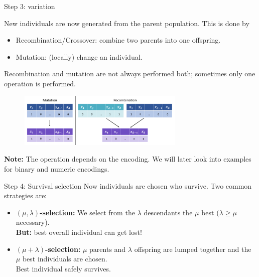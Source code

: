 \documentclass[11pt,compress,t,notes=noshow, xcolor=table]{beamer}
\begin{document}
\begin{vbframe}{Step 3: variation}

New individuals are now generated from the parent population. This is done by

\begin{itemize}
\item Recombination/Crossover: combine two parents into one offspring.
\item Mutation: (locally) change an individual.
\end{itemize}

Recombination and mutation are not always performed both; sometimes only one operation is performed.

\vspace{0.3cm}
\begin{center}
\begin{figure}
  \includegraphics[width = 8cm, height = 2.6cm ]{figure_man/rec-and-mut.png}\\
\end{figure}
\end{center}

\textbf{Note: } The operation depends on the encoding. We will later look into examples for binary and numeric encodings. 

\end{vbframe}




  
\begin{vbframe}{Step 4: Survival selection}
  Now individuals are chosen who survive. Two common strategies are:
  \begin{itemize}
  \item \textbf{$(\mu, \lambda)$-selection:} We select from the $\lambda$ descendants the $\mu$ best ($\lambda \ge \mu$ necessary).\\
  \textbf{But:} best overall individual can get lost!
  \item \textbf{$(\mu + \lambda)$-selection:} $\mu$ parents and $\lambda$ offspring are lumped together and the $\mu$ best individuals are chosen.\\
  Best individual safely survives.
  \end{itemize}

\end{vbframe}
\end{document}
